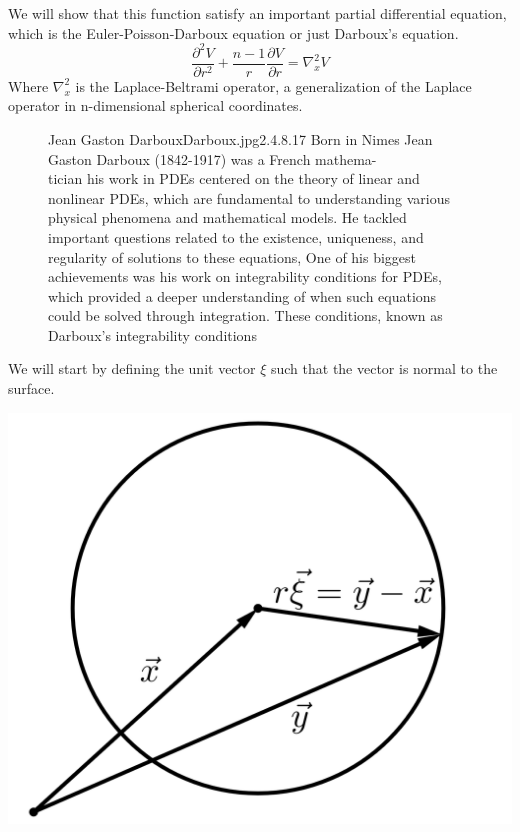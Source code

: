 \documentclass[]{article}
\begin{document}
We will show that this function satisfy an important partial differential equation, which is the Euler-Poisson-Darboux equation or just Darboux's equation.
\begin{equation}
\frac{\partial^2 V}{\partial r^2} + \frac{n-1}{r}\frac{\partial V}{\partial r} = \nabla_{x}^{2} V
\end{equation} 
Where $\nabla_{x}^{2}$ is the Laplace-Beltrami operator, a generalization of the Laplace operator in n-dimensional spherical coordinates.
\par
\begin{figure}[b]
    \begin{enrichment}{Jean Gaston Darboux}{Darboux.jpg}{2.4}{.8}{.17}
        Born in Nimes Jean Gaston Darboux (1842-1917) was a French mathema-
        \\
        tician his work in PDEs centered on the theory of linear and nonlinear PDEs, 
        which are fundamental to understanding various physical phenomena and mathematical models. 
        He tackled important questions related to the existence, uniqueness, and regularity of solutions to these equations, 
        One of his biggest achievements was his work on integrability conditions for PDEs, which provided a deeper understanding of when such equations could be solved through integration. These conditions, known as Darboux's integrability conditions
    \end{enrichment}    
\end{figure}
We will start by defining the unit vector $\xi$ such that the vector is normal to the surface.
\begin{center}
\includegraphics[scale=0.1]{xi.png}
\end{center}
\end{document}
